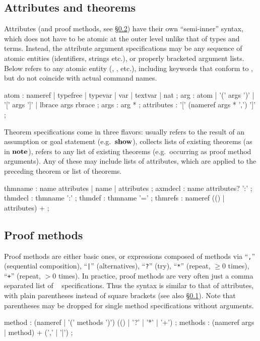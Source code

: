 \subsection{Attributes and theorems}\label{sec:syn-att}

Attributes (and proof methods, see \S\ref{sec:syn-meth}) have their own
``semi-inner'' syntax, which does not have to be atomic at the outer level
unlike that of types and terms.  Instead, the attribute argument
specifications may be any sequence of atomic entities (identifiers, strings
etc.), or properly bracketed argument lists.  Below  refers to
any atomic entity (, ,
 etc.), including keywords that conform to
, but do not coincide with actual command names.

\begin{rail}
  atom : nameref | typefree | typevar | var | textvar | nat
  ;
  arg : atom | '(' args ')' | '[' args ']' | lbrace args rbrace
  ;
  args : arg *
  ;
  attributes : '[' (nameref args * ',') ']'
  ;
\end{rail}

Theorem specifications come in three flavors:  usually
refers to the result of an assumption or goal statement (e.g.\ ${\mathord{\mathbf{show}}}$),
 collects lists of existing theorems (as in ${\mathord{\mathbf{note}}}$),
 refers to any list of existing theorems (e.g.\ occurring
as proof method arguments).  Any of these may include lists of attributes,
which are applied to the preceding theorem or list of theorems.

\begin{rail}
  thmname : name attributes | name | attributes
  ;
  axmdecl : name attributes? ':'
  ;
  thmdecl : thmname ':'
  ;
  thmdef : thmname '='
  ;
  thmrefs : nameref (() | attributes) +
  ;
\end{rail}


\subsection{Proof methods}\label{sec:syn-meth}

Proof methods are either basic ones, or expressions composed of methods via
``\texttt{,}'' (sequential composition), ``\texttt{|}'' (alternatives),
``\texttt{?}'' (try), ``\texttt{*}'' (repeat, ${} \ge 0$ times),
``\texttt{+}'' (repeat, ${} > 0$ times).  In practice, proof methods are very
often just a comma separated list of ~
specifications.  Thus the syntax is similar to that of attributes, with plain
parentheses instead of square brackets (see also \S\ref{sec:syn-att}).  Note
that parentheses may be dropped for single method specifications without
arguments.

\begin{rail}
  method : (nameref | '(' methods ')') (() | '?' | '*' | '+')
  ;
  methods : (nameref args | method) + (',' | '|')
  ;
\end{rail}


